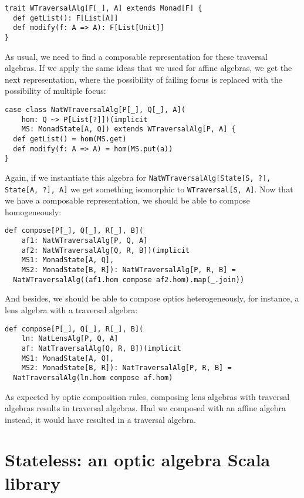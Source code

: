 \documentclass[preview, 3p]{elsarticle}
\begin{document}
\begin{lstlisting}
trait WTraversalAlg[F[_], A] extends Monad[F] {
  def getList(): F[List[A]]
  def modify(f: A => A): F[List[Unit]]
}
\end{lstlisting}

As usual, we need to find a composable representation for these traversal
algebras. If we apply the same ideas that we used for affine algebras, we get
the next representation, where the possibility of failing focus is replaced with
the possibility of multiple focus:

\begin{lstlisting}
case class NatWTraversalAlg[P[_], Q[_], A](
    hom: Q ~> P[List[?]])(implicit
    MS: MonadState[A, Q]) extends WTraversalAlg[P, A] {
  def getList() = hom(MS.get)
  def modify(f: A => A) = hom(MS.put(a))
}
\end{lstlisting}

Again, if we instantiate this algebra for
\lstinline{NatWTraversalAlg[State[S, ?], State[A, ?], A]} we get something
isomorphic to \lstinline{WTraversal[S, A]}. Now that we have a composable
representation, we should be able to compose homogeneously:

\begin{lstlisting}
def compose[P[_], Q[_], R[_], B](
    af1: NatWTraversalAlg[P, Q, A]
    af2: NatWTraversalAlg[Q, R, B])(implicit
    MS1: MonadState[A, Q],
    MS2: MonadState[B, R]): NatWTraversalAlg[P, R, B] =
  NatWTraversalAlg((af1.hom compose af2.hom).map(_.join))
\end{lstlisting}

And besides, we should be able to compose optics heterogeneously, for instance,
a lens algebra with a traversal algebra:

\begin{lstlisting}
def compose[P[_], Q[_], R[_], B](
    ln: NatLensAlg[P, Q, A]
    af: NatTraversalAlg[Q, R, B])(implicit
    MS1: MonadState[A, Q],
    MS2: MonadState[B, R]): NatTraversalAlg[P, R, B] =
  NatTraversalAlg(ln.hom compose af.hom)
\end{lstlisting}

As expected by optic composition rules, composing lens algebras with traversal
algebras results in traversal algebras. Had we composed with an affine algebra
instead, it would have resulted in a traversal algebra.

\section{Stateless: an optic algebra Scala library}
\label{sec:Stateless}
\end{document}
